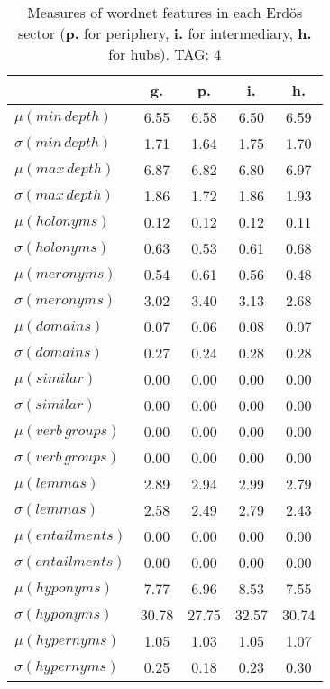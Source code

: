 \begin{table}[h!]
\begin{center}
\begin{tabular}{| l | c | c | c | c |}\hline
 & g. & p. & i. & h. \\\hline
$\mu(min\,depth)$ & 6.55  & 6.58  & 6.50  & 6.59 \\\hline
$\sigma(min\,depth)$ & 1.71  & 1.64  & 1.75  & 1.70 \\\hline
$\mu(max\,depth)$ & 6.87  & 6.82  & 6.80  & 6.97 \\\hline
$\sigma(max\,depth)$ & 1.86  & 1.72  & 1.86  & 1.93 \\\hline
$\mu(holonyms)$ & 0.12  & 0.12  & 0.12  & 0.11 \\\hline
$\sigma(holonyms)$ & 0.63  & 0.53  & 0.61  & 0.68 \\\hline
$\mu(meronyms)$ & 0.54  & 0.61  & 0.56  & 0.48 \\\hline
$\sigma(meronyms)$ & 3.02  & 3.40  & 3.13  & 2.68 \\\hline
$\mu(domains)$ & 0.07  & 0.06  & 0.08  & 0.07 \\\hline
$\sigma(domains)$ & 0.27  & 0.24  & 0.28  & 0.28 \\\hline
$\mu(similar)$ & 0.00  & 0.00  & 0.00  & 0.00 \\\hline
$\sigma(similar)$ & 0.00  & 0.00  & 0.00  & 0.00 \\\hline
$\mu(verb\,groups)$ & 0.00  & 0.00  & 0.00  & 0.00 \\\hline
$\sigma(verb\,groups)$ & 0.00  & 0.00  & 0.00  & 0.00 \\\hline
$\mu(lemmas)$ & 2.89  & 2.94  & 2.99  & 2.79 \\\hline
$\sigma(lemmas)$ & 2.58  & 2.49  & 2.79  & 2.43 \\\hline
$\mu(entailments)$ & 0.00  & 0.00  & 0.00  & 0.00 \\\hline
$\sigma(entailments)$ & 0.00  & 0.00  & 0.00  & 0.00 \\\hline
$\mu(hyponyms)$ & 7.77  & 6.96  & 8.53  & 7.55 \\\hline
$\sigma(hyponyms)$ & 30.78  & 27.75  & 32.57  & 30.74 \\\hline
$\mu(hypernyms)$ & 1.05  & 1.03  & 1.05  & 1.07 \\\hline
$\sigma(hypernyms)$ & 0.25  & 0.18  & 0.23  & 0.30 \\\hline
\end{tabular}
\caption{Measures of wordnet features in each Erd\"os sector ({{\bf p.}} for periphery, {{\bf i.}} for intermediary, {{\bf h.}} for hubs). TAG: 4}
\end{center}
\end{table}